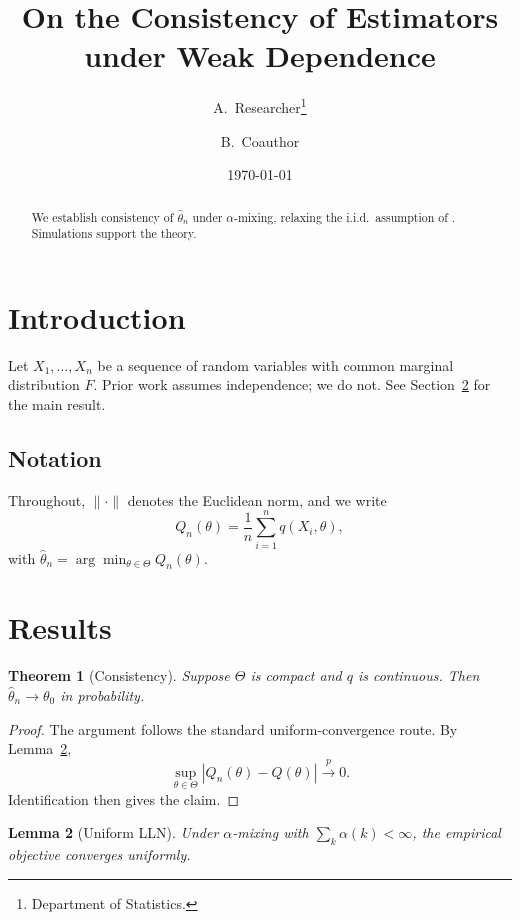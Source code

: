 \documentclass[11pt,a4paper]{article}
\title{On the Consistency of Estimators under Weak Dependence}
\author{A.\ Researcher\thanks{Department of Statistics.} \and B.\ Coauthor}
\date{\today}
\newtheorem{theorem}{Theorem}[section]
\newtheorem{lemma}[theorem]{Lemma}
\begin{document}
\maketitle

\begin{abstract}
We establish consistency of $\hat\theta_n$ under $\alpha$-mixing, relaxing the
i.i.d.\ assumption of \citet{knuth1984}. Simulations support the theory.
\end{abstract}

\section{Introduction}
\label{sec:intro}

Let $X_1,\dots,X_n$ be a sequence of random variables with common marginal
distribution $F$. Prior work \citep{knuth1984,lamport1994} assumes independence;
we do not. See Section~\ref{sec:results} for the main result.

\subsection{Notation}
\label{sec:notation}

Throughout, $\|\cdot\|$ denotes the Euclidean norm, and we write
\begin{equation}
  \label{eq:objective}
  Q_n(\theta) = \frac{1}{n} \sum_{i=1}^{n} q(X_i, \theta),
\end{equation}
with $\hat\theta_n = \arg\min_{\theta \in \Theta} Q_n(\theta)$.

\section{Results}
\label{sec:results}

\begin{theorem}[Consistency]
\label{thm:main}
Suppose $\Theta$ is compact and $q$ is continuous. Then
$\hat\theta_n \to \theta_0$ in probability.
\end{theorem}

\begin{proof}
The argument follows the standard uniform-convergence route. By
Lemma~\ref{lem:ulln},
\[
  \sup_{\theta \in \Theta} \left| Q_n(\theta) - Q(\theta) \right| \xrightarrow{p} 0 .
\]
Identification then gives the claim.
\end{proof}

\begin{lemma}[Uniform LLN]
\label{lem:ulln}
Under $\alpha$-mixing with $\sum_k \alpha(k) < \infty$, the empirical objective
converges uniformly.
\end{lemma}
\end{document}

